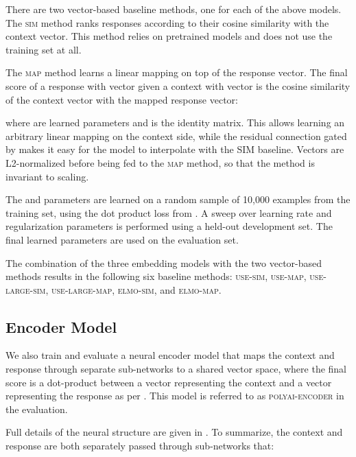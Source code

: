 \documentclass[11pt,a4paper,table]{article}
\newcommand\encoder{polyai-encoder}
\newcommand\encoder{encoder}
\begin{document}
There are two vector-based baseline methods, one for each of the above models. The \textsc{sim} method ranks responses according to their cosine similarity with the context vector. This method relies on pretrained models and does not use the training set at all.

The \textsc{map} method learns a linear mapping on top of the response vector. The final score of a response with vector  given a context with vector  is the cosine similarity  of the context vector with the mapped response vector:

where  are learned parameters and  is the identity matrix. This allows learning an arbitrary linear mapping on the context side, while the residual connection gated by  makes it easy for the model to interpolate with the \textsc{SIM} baseline. Vectors are L2-normalized before being fed to the \textsc{map} method, so that the method is invariant to scaling.

The  and  parameters are learned on a random sample of 10,000 examples from the training set, using the dot product loss from . A sweep over learning rate and regularization parameters is performed using a held-out development set. The final learned parameters are used on the evaluation set.

The combination of the three embedding models with the two vector-based methods results in the following six baseline methods: \textsc{use-sim, use-map, use-large-sim, use-large-map, elmo-sim,} and \textsc{elmo-map}.


\subsection{Encoder Model} \label{sec:encoder}

We also train and evaluate a neural encoder model that maps the context and response through separate sub-networks to a shared vector space, where the final score is a dot-product between a vector representing the context and a vector representing the response as per . This model is referred to as \textsc{\encoder} in the evaluation.

Full details of the neural structure are given in . To summarize, the context and response are both separately passed through sub-networks that:
\end{document}
